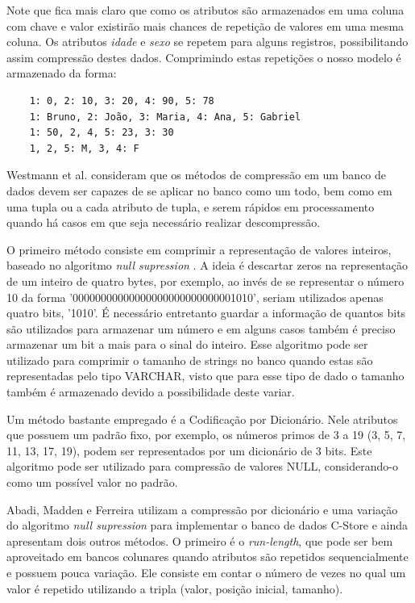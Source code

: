 Note que fica mais claro que como os atributos são armazenados em uma coluna com chave e valor 
existirão mais chances de repetição de valores em uma mesma coluna. Os atributos \textit{idade} e 
\textit{sexo} se repetem para alguns registros, possibilitando assim compressão destes dados. 
Comprimindo estas repetições o nosso modelo é armazenado da forma: 

\begin{verbatim}
    1: 0, 2: 10, 3: 20, 4: 90, 5: 78
    1: Bruno, 2: João, 3: Maria, 4: Ana, 5: Gabriel
    1: 50, 2, 4, 5: 23, 3: 30
    1, 2, 5: M, 3, 4: F
\end{verbatim}

Westmann et al. \cite{westmann2000implementation} consideram que os métodos de compressão em um banco de dados devem ser capazes de se aplicar 
no banco como um todo, bem como em uma tupla ou a cada atributo de tupla, e serem rápidos em processamento quando há casos em que seja 
necessário realizar descompressão.

O primeiro método consiste em comprimir a representação de valores inteiros, baseado no algoritmo \textit{null supression} \cite{westmann2000implementation, roth1993database}. A ideia é descartar zeros na representação de um inteiro de quatro bytes, por exemplo, 
ao invés de se representar o número 10 da forma '00000000000000000000000000001010', seriam utilizados apenas quatro bits, '1010'. É 
necessário entretanto guardar a informação de quantos bits são utilizados para armazenar um número e em alguns casos também é preciso 
armazenar um bit a mais para o sinal do inteiro. Esse algoritmo pode ser utilizado para comprimir o tamanho de strings no banco 
quando estas são representadas pelo tipo VARCHAR, visto que para esse tipo de dado o tamanho também é armazenado devido a possibilidade 
deste variar.

Um método bastante empregado é a Codificação por Dicionário. Nele atributos que possuem um padrão fixo, por exemplo, os números primos de 
3 a 19 (3, 5, 7, 11, 13, 17, 19), podem ser representados por um dicionário de 3 bits. Este algoritmo pode ser utilizado para compressão 
de valores NULL, considerando-o como um possível valor no padrão.

Abadi, Madden e Ferreira \cite{abadi2006integrating} utilizam a compressão por dicionário e uma variação do algoritmo \textit{null supression} para implementar o banco de dados C-Store e ainda apresentam dois outros métodos. O primeiro é o \textit{run-length}, que pode ser bem aproveitado 
em bancos colunares quando atributos são repetidos sequencialmente e possuem pouca variação. Ele consiste em contar o número de vezes no qual 
um valor é repetido utilizando a tripla (valor, posição inicial, tamanho). 



